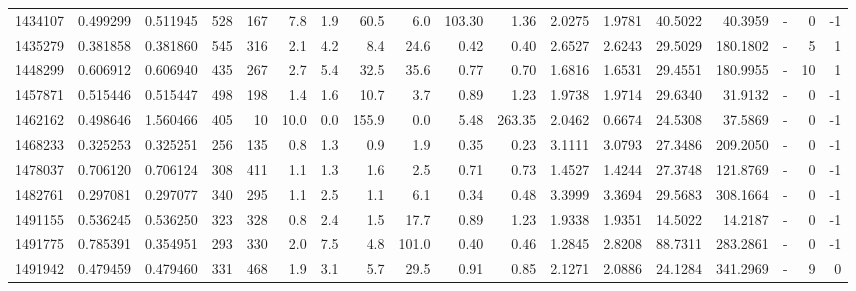 \begin{tabular}{rrrrrrrrrrrrrrrlrr}
   1434107 & 0.499299 &   0.511945 &  528 &  167 &      7.8 &      1.9 &    60.5 &      6.0 &     103.30 &        1.36 &  2.0275 &  1.9781 &   40.5022 &   40.3959 &             - &        0 &         -1 \\
   1435279 & 0.381858 &   0.381860 &  545 &  316 &      2.1 &      4.2 &     8.4 &     24.6 &       0.42 &        0.40 &  2.6527 &  2.6243 &   29.5029 &  180.1802 &             - &        5 &          1 \\
   1448299 & 0.606912 &   0.606940 &  435 &  267 &      2.7 &      5.4 &    32.5 &     35.6 &       0.77 &        0.70 &  1.6816 &  1.6531 &   29.4551 &  180.9955 &             - &       10 &          1 \\
   1457871 & 0.515446 &   0.515447 &  498 &  198 &      1.4 &      1.6 &    10.7 &      3.7 &       0.89 &        1.23 &  1.9738 &  1.9714 &   29.6340 &   31.9132 &             - &        0 &         -1 \\
   1462162 & 0.498646 &   1.560466 &  405 &   10 &     10.0 &      0.0 &   155.9 &      0.0 &       5.48 &      263.35 &  2.0462 &  0.6674 &   24.5308 &   37.5869 &             - &        0 &         -1 \\
   1468233 & 0.325253 &   0.325251 &  256 &  135 &      0.8 &      1.3 &     0.9 &      1.9 &       0.35 &        0.23 &  3.1111 &  3.0793 &   27.3486 &  209.2050 &             - &        0 &         -1 \\
   1478037 & 0.706120 &   0.706124 &  308 &  411 &      1.1 &      1.3 &     1.6 &      2.5 &       0.71 &        0.73 &  1.4527 &  1.4244 &   27.3748 &  121.8769 &             - &        0 &         -1 \\
   1482761 & 0.297081 &   0.297077 &  340 &  295 &      1.1 &      2.5 &     1.1 &      6.1 &       0.34 &        0.48 &  3.3999 &  3.3694 &   29.5683 &  308.1664 &             - &        0 &         -1 \\
   1491155 & 0.536245 &   0.536250 &  323 &  328 &      0.8 &      2.4 &     1.5 &     17.7 &       0.89 &        1.23 &  1.9338 &  1.9351 &   14.5022 &   14.2187 &             - &        0 &         -1 \\
   1491775 & 0.785391 &   0.354951 &  293 &  330 &      2.0 &      7.5 &     4.8 &    101.0 &       0.40 &        0.46 &  1.2845 &  2.8208 &   88.7311 &  283.2861 &             - &        0 &         -1 \\
   1491942 & 0.479459 &   0.479460 &  331 &  468 &      1.9 &      3.1 &     5.7 &     29.5 &       0.91 &        0.85 &  2.1271 &  2.0886 &   24.1284 &  341.2969 &             - &        9 &          0 \\

\end{tabular}
